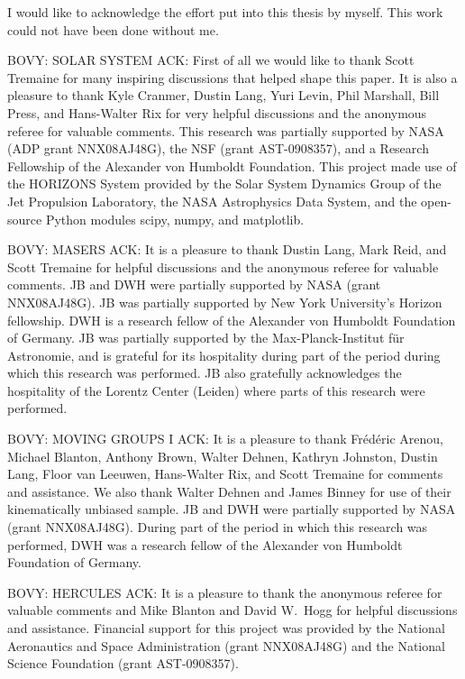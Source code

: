 %
I would like to acknowledge the effort put into this thesis by
myself. This work could not have been done without me.


BOVY: SOLAR SYSTEM ACK: First of all we would like to thank Scott
Tremaine for many inspiring discussions that helped shape this
paper. It is also a pleasure to thank Kyle Cranmer, Dustin Lang, Yuri
Levin, Phil Marshall, Bill Press, and Hans-Walter Rix for very helpful
discussions and the anonymous referee for valuable comments. This
research was partially supported by NASA (ADP grant NNX08AJ48G), the
NSF (grant AST-0908357), and a Research Fellowship of the Alexander
von Humboldt Foundation. This project made use of the HORIZONS System
provided by the Solar System Dynamics Group of the Jet Propulsion
Laboratory, the NASA Astrophysics Data System, and the open-source
Python modules scipy, numpy, and matplotlib.

BOVY: MASERS ACK: It is a pleasure to thank Dustin Lang, Mark Reid,
and Scott Tremaine for helpful discussions and the anonymous referee
for valuable comments. JB and DWH were partially supported by NASA
(grant NNX08AJ48G). JB was partially supported by New York
University's Horizon fellowship. DWH is a research fellow of the
Alexander von Humboldt Foundation of Germany. JB was partially
supported by the Max-Planck-Institut f\"ur Astronomie, and is grateful
for its hospitality during part of the period during which this
research was performed. JB also gratefully acknowledges the
hospitality of the Lorentz Center (Leiden) where parts of this
research were performed.

BOVY: MOVING GROUPS I ACK: It is a pleasure to thank Fr{\'e}d{\'e}ric
Arenou, Michael Blanton, Anthony Brown, Walter Dehnen, Kathryn
Johnston, Dustin Lang, Floor van Leeuwen, Hans-Walter Rix, and Scott
Tremaine for comments and assistance. We also thank Walter Dehnen and
James Binney for use of their kinematically unbiased sample. JB and
DWH were partially supported by NASA (grant NNX08AJ48G). During part
of the period in which this research was performed, DWH was a research
fellow of the Alexander von Humboldt Foundation of Germany.


BOVY: HERCULES ACK: It is a pleasure to thank the anonymous referee
for valuable comments and Mike Blanton and David W.~Hogg for helpful
discussions and assistance.  Financial support for this project was
provided by the National Aeronautics and Space Administration (grant
NNX08AJ48G) and the National Science Foundation (grant AST-0908357).



